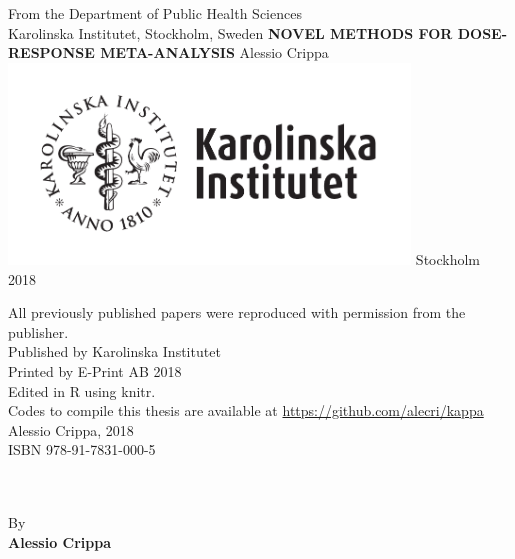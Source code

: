 \documentclass[11pt,a4paper,twoside,openany]{book}\usepackage{knitr}
\begin{document}
\frontmatter
\pagestyle{nothing}

%

\begin{titlepage}
\begin{center}
\large
From the Department of Public Health Sciences \\
Karolinska Institutet, Stockholm, Sweden        
\vfill
\Large
\textbf{\textsf{NOVEL METHODS FOR DOSE-RESPONSE META-ANALYSIS}}
\vfill
\Large
Alessio Crippa
\vfill
\includegraphics[width=0.8\textwidth]{figures/ki-logo_pos}
\vfill
\large
Stockholm 2018        
\end{center}
\restoregeometry
\end{titlepage}

\newpage
\null
\vfill
\noindent All previously published papers were reproduced with permission from the publisher. \\
Published by Karolinska Institutet \\
\bigskip
Printed by E-Print AB 2018 \\
Edited in R using knitr. \\
Codes to compile this thesis are available at \url{https://github.com/alecri/kappa} \\
\textcopyright Alessio Crippa, 2018 \\
ISBN 978-91-7831-000-5
\newpage

%
\null
\vspace{1.5cm}
\\
\\
By \vspace{.5cm} \\
{\Large \textbf{\textsf{Alessio Crippa}} \vspace{1.5cm}}\\
\end{document}
